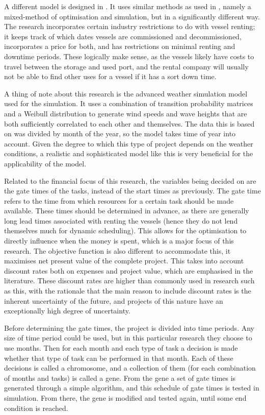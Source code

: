 \documentclass[a4paper,12pt]{article}
\begin{document}
\bigskip

A different model is designed in \cite{kerkhove2017optimised}. It uses similar methods as used in \cite{barlow2018mixed}, namely a mixed-method of optimisation and simulation, but in a significantly different way. The research incorporates certain industry restrictions to do with vessel renting; it keeps track of which dates vessels are commissioned and decommissioned, incorporates a price for both, and has restrictions on minimal renting and downtime periods. These logically make sense, as the vessels likely have costs to travel between the storage and used port, and the rental company will usually not be able to find other uses for a vessel if it has a sort down time. 

A thing of note about this research is the advanced weather simulation model used for the simulation. It uses a combination of transition probability matrices and a Weibull distribution to generate wind speeds and wave heights that are both sufficiently correlated to each other and themselves. The data this is based on was divided by month of the year, so the model takes time of year into account. Given the degree to which this type of project depends on the weather conditions, a realistic and sophisticated model like this is very beneficial for the applicability of the model. 

Related to the financial focus of this research, the variables being decided on are the gate times of the tasks, instead of the start times as previously. The gate time refers to the time from which resources for a certain task should be made available. These times should be determined in advance, as there are generally long lead times associated with renting the vessels (hence they do not lend themselves much for dynamic scheduling). This allows for the optimisation to directly influence when the money is spent, which is a major focus of this research. The objective function is also different to accommodate this, it maximises net present value of the complete project. This takes into account discount rates both on expenses and project value, which are emphasised in the literature. These discount rates are higher than commonly used in research such as this, with the rationale that the main reason to include discount rates is the inherent uncertainty of the future, and projects of this nature have an exceptionally high degree of uncertainty.

Before determining the gate times, the project is divided into time periods. Any size of time period could be used, but in this particular research they choose to use months. Then for each month and each type of task a decision is made whether that type of task can be performed in that month. Each of these decisions is called a chromosome, and a collection of them (for each combination of months and tasks) is called a gene. From the gene a set of gate times is generated through a simple algorithm, and this schedule of gate times is tested in simulation. From there, the gene is modified and tested again, until some end condition is reached. 
\end{document}
